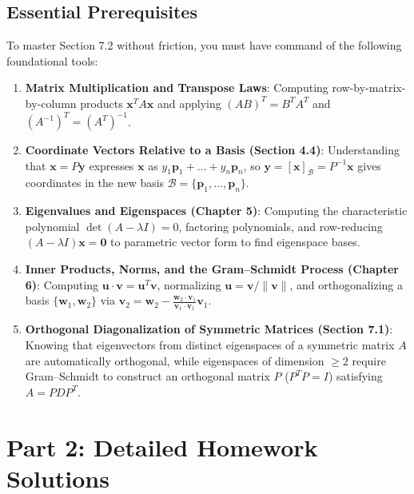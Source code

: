 \documentclass[11pt, letterpaper]{article}
\theoremstyle{definition}
\theoremstyle{remark}
\begin{document}
\subsection{Essential Prerequisites}

To master Section 7.2 without friction, you must have command of the following foundational tools:
\begin{enumerate}
    \item \textbf{Matrix Multiplication and Transpose Laws}: Computing row-by-matrix-by-column products $\mathbf{x}^T A \mathbf{x}$ and applying $(AB)^T = B^T A^T$ and $(A^{-1})^T = (A^T)^{-1}$.
    \item \textbf{Coordinate Vectors Relative to a Basis (Section 4.4)}: Understanding that $\mathbf{x} = P\mathbf{y}$ expresses $\mathbf{x}$ as $y_1 \mathbf{p}_1 + \dots + y_n \mathbf{p}_n$, so $\mathbf{y} = [\mathbf{x}]_{\mathcal{B}} = P^{-1}\mathbf{x}$ gives coordinates in the new basis $\mathcal{B} = \{\mathbf{p}_1, \dots, \mathbf{p}_n\}$.
    \item \textbf{Eigenvalues and Eigenspaces (Chapter 5)}: Computing the characteristic polynomial $\det(A - \lambda I) = 0$, factoring polynomials, and row-reducing $(A - \lambda I)\mathbf{x} = \mathbf{0}$ to parametric vector form to find eigenspace bases.
    \item \textbf{Inner Products, Norms, and the Gram--Schmidt Process (Chapter 6)}: Computing $\mathbf{u} \cdot \mathbf{v} = \mathbf{u}^T \mathbf{v}$, normalizing $\mathbf{u} = \mathbf{v}/\|\mathbf{v}\|$, and orthogonalizing a basis $\{\mathbf{w}_1, \mathbf{w}_2\}$ via $\mathbf{v}_2 = \mathbf{w}_2 - \frac{\mathbf{w}_2 \cdot \mathbf{v}_1}{\mathbf{v}_1 \cdot \mathbf{v}_1}\mathbf{v}_1$.
    \item \textbf{Orthogonal Diagonalization of Symmetric Matrices (Section 7.1)}: Knowing that eigenvectors from distinct eigenspaces of a symmetric matrix $A$ are automatically orthogonal, while eigenspaces of dimension $\ge 2$ require Gram--Schmidt to construct an orthogonal matrix $P$ ($P^T P = I$) satisfying $A = P D P^T$.
\end{enumerate}

\newpage
\section{Part 2: Detailed Homework Solutions}
\end{document}
